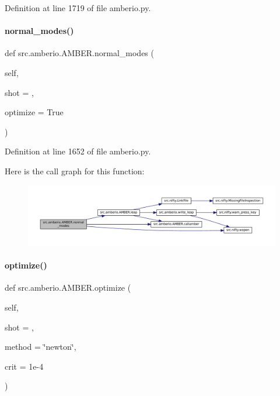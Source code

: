 Definition at line 1719 of file amberio.\+py.

\mbox{\label{classsrc_1_1amberio_1_1AMBER_a6ca7af7847306ec7c8e62eddf1900f93}} 
\paragraph{\texorpdfstring{normal\+\_\+modes()}{normal\_modes()}}
{\footnotesize\ttfamily def src.\+amberio.\+A\+M\+B\+E\+R.\+normal\+\_\+modes (\begin{DoxyParamCaption}\item[{}]{self,  }\item[{}]{shot = {},  }\item[{}]{optimize = {\ttfamily True} }\end{DoxyParamCaption})}



Definition at line 1652 of file amberio.\+py.

Here is the call graph for this function\+:
\nopagebreak
\begin{figure}[H]
\begin{center}
\leavevmode
\includegraphics[width=350pt]{classsrc_1_1amberio_1_1AMBER_a6ca7af7847306ec7c8e62eddf1900f93_cgraph}
\end{center}
\end{figure}
\mbox{\label{classsrc_1_1amberio_1_1AMBER_a51ec039c6c984fa79e83be0d0c71a5b7}} 
\paragraph{\texorpdfstring{optimize()}{optimize()}}
{\footnotesize\ttfamily def src.\+amberio.\+A\+M\+B\+E\+R.\+optimize (\begin{DoxyParamCaption}\item[{}]{self,  }\item[{}]{shot = {},  }\item[{}]{method = {\ttfamily \char`\"{}newton\char`\"{}},  }\item[{}]{crit = {\ttfamily 1e-\/4} }\end{DoxyParamCaption})}



